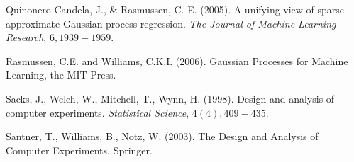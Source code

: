 \begin{thebibliography}{94}


 Quinonero-Candela, J., \& Rasmussen, C. E. (2005). A unifying view of sparse approximate Gaussian process regression. {\it The Journal of Machine Learning Research}, $6, 1939-1959$.


 Rasmussen, C.E. and Williams, C.K.I. (2006). Gaussian Processes for Machine Learning, the MIT Press.





 Sacks, J., Welch, W., Mitchell, T., Wynn, H. (1998). Design and analysis of computer experiments. {\it Statistical Science}, $4(4), 409-435$.


 Santner, T., Williams, B., Notz, W. (2003). The Design and Analysis of Computer Experiments. Springer.



\end{thebibliography}
